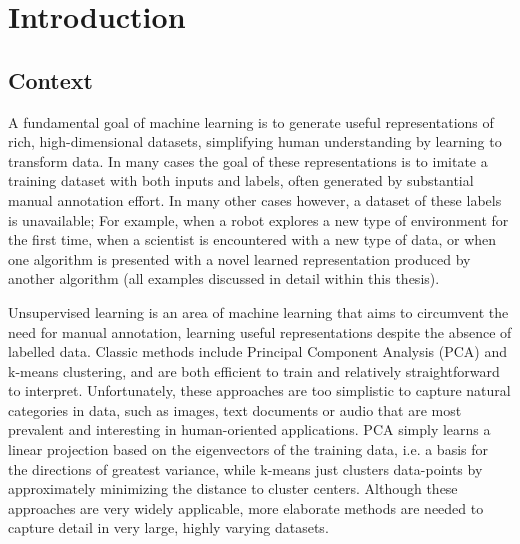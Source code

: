 \chapter{Introduction} \label{ch:intro}

\section{Context} \label{sec:intro-context}
A fundamental goal of machine learning is to generate useful representations of rich, high-dimensional datasets, simplifying human understanding by learning to transform data. In many cases the goal of these representations is to imitate a training dataset with both inputs and labels, often generated by substantial manual annotation effort.
In many other cases however, a dataset of these labels is unavailable; For example, when a robot explores a new type of environment for the first time, when a scientist is encountered with a new type of data, or when one algorithm is presented with a novel learned representation produced by another algorithm (all examples discussed in detail within this thesis).

Unsupervised learning is an area of machine learning that aims to circumvent the need for manual annotation, learning useful representations despite the absence of labelled data. Classic methods include Principal Component Analysis (PCA) and k-means clustering, and are both efficient to train and relatively straightforward to interpret. Unfortunately, these approaches are too simplistic to capture natural categories in data, such as images, text documents or audio that are most prevalent and interesting in human-oriented applications. PCA simply learns a linear projection based on the eigenvectors of the training data, i.e. a basis for the directions of greatest variance, while k-means just clusters data-points by approximately minimizing the distance to cluster centers. Although these approaches are very widely applicable, more elaborate methods are needed to capture detail in very large, highly varying datasets.

